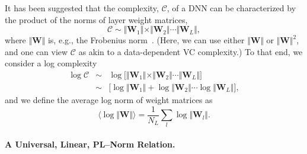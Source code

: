 
It has been suggested that the complexity, $\mathcal{C}$, of a DNN can be characterized by the product of the norms of layer weight matrices,
$$
\mathcal{C}\sim\Vert\mathbf{W}_{1}\Vert\times\Vert\mathbf{W}_{2}\Vert\cdots\Vert\mathbf{W}_{L}\Vert ,
$$
where $\Vert\mathbf{W}\Vert$ is, e.g., the Frobenius norm~\cite{LMBx18_TR, SHNx17_TR,PLMx18_TR}.
(Here, we can use either $\Vert\mathbf{W}\Vert$ or $\Vert\mathbf{W}\Vert^{2}$, and one can view $\mathcal{C}$ as akin to a data-dependent VC complexity.)
To that end, we consider a log complexity
\begin{eqnarray*}
\log\mathcal{C} &\sim& \log\bigg[\Vert\mathbf{W}_{1}\Vert\times\Vert\mathbf{W}_{2}\Vert\cdots\Vert\mathbf{W}_{L}\Vert\bigg]  \\
                &\sim& \bigg[\log\Vert\mathbf{W}_{1}\Vert+\log\Vert\mathbf{W}_{2}\Vert\cdots\log\Vert\mathbf{W}_{L}\Vert\bigg]  ,
\end{eqnarray*}
and we define the average log norm of weight matrices as
\begin{equation}
\langle\log\Vert\mathbf{W}\Vert\rangle=\dfrac{1}{N_{L}}\sum_{l}\log\Vert\mathbf{W}_{l}\Vert  .
\label{eqn:av_log_norm}
\end{equation}



\paragraph{A Universal, Linear, PL--Norm Relation.} 

